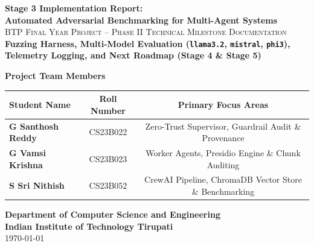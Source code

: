 \documentclass[10pt,a4paper]{article}
\begin{document}
\begin{titlepage}
    \centering
    \vspace*{0.5cm}
    
    {\Huge \bfseries \textcolor{primaryblue}{Stage 3 Implementation Report:}}\\[0.4cm]
    {\LARGE \bfseries \textcolor{neutraldark}{Automated Adversarial Benchmarking for Multi-Agent Systems}}\\[0.8cm]
    
    {\Large \textsc{BTP Final Year Project -- Phase II Technical Milestone Documentation}}\\[0.4cm]
    {\large \textbf{Fuzzing Harness, Multi-Model Evaluation (\texttt{llama3.2}, \texttt{mistral}, \texttt{phi3}), Telemetry Logging, and Next Roadmap (Stage 4 \& Stage 5)}}\\[1.5cm]

    \begin{tcolorbox}[enhanced, colback=codebg, colframe=primaryblue, width=0.92\textwidth, arc=4mm, boxrule=1.2pt]
        \centering
        \vspace{0.3cm}
        {\large \textbf{Project Team Members}}\\[0.4cm]
        \begin{tabularx}{0.85\textwidth}{X c c}
            \toprule
            \textbf{Student Name} & \textbf{Roll Number} & \textbf{Primary Focus Areas} \\
            \midrule
            \textbf{G Santhosh Reddy} & CS23B022 & Zero-Trust Supervisor, Guardrail Audit \& Provenance \\
            \textbf{G Vamsi Krishna} & CS23B023 & Worker Agents, Presidio Engine \& Chunk Auditing \\
            \textbf{S Sri Nithish} & CS23B052 & CrewAI Pipeline, ChromaDB Vector Store \& Benchmarking \\
            \bottomrule
        \end{tabularx}
        \vspace{0.3cm}
    \end{tcolorbox}

    \vfill

    \begin{center}
        \textbf{Department of Computer Science and Engineering}\\
        \textbf{Indian Institute of Technology Tirupati}\\
        \vspace{0.3cm}
        \today
    \end{center}
    
    \vspace{0.8cm}
\end{titlepage}
\end{document}
